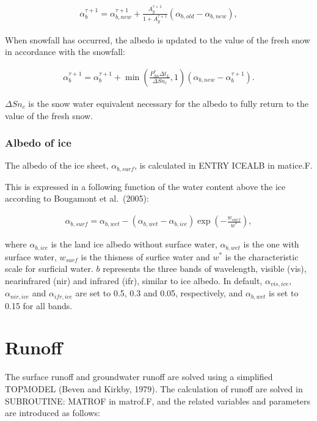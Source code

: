 \begin{eqnarray}
\alpha_b^{\tau+1} = \alpha_{b,new}^{\tau+1} + \frac{A_g^{\tau+1}}{1+A_g^{\tau+1}} (\alpha_{b,old}-\alpha_{b,new}), \label{8-62}
\end{eqnarray}

When snowfall has occurred, the albedo is updated to the value of the fresh snow in accordance with the snowfall:

\begin{eqnarray}
\alpha_b^{\tau+1} = \alpha_b^{\tau+1} + \min\left( \frac{P_{Sn}^{\ast} \Delta t_L}{\Delta Sn_c}, 1 \right) (\alpha_{b,new} - \alpha_b^{\tau+1}). \label{8-63}
\end{eqnarray}

\(\Delta Sn_c\) is the snow water equivalent necessary for the albedo to fully return to the value of the fresh snow.

\hypertarget{albedo-of-ice}{%
\subsubsection{Albedo of ice}\label{albedo-of-ice}}

The albedo of the ice sheet, \(\alpha_{b,surf}\), is calculated in ENTRY ICEALB in matice.F.

This is expressed in a following function of the water content above the ice according to Bougamont et al.~(2005):

\begin{eqnarray}
\alpha_{b,surf} = \alpha_{b,wet} - (\alpha_{b,wet}-\alpha_{b,ice}) \exp{\left( -\frac{w_{surf}}{w^{\ast}} \right)}, \label{8-64}
\end{eqnarray}

where \(\alpha_{b,ice}\) is the land ice albedo without surface water, \(\alpha_{b,wet}\) is the one with surface water, \(w_{surf}\) is the thisness of surfice water and \(w^{\ast}\) is the
characteristic scale for surficial water. \(b\) represents the three bands of wavelength, visible (vis), nearinfrared (nir) and infrared (ifr), similar to ice albedo. In default, \(\alpha_{vis,ice}\),
\(\alpha_{nir,ice}\) and \(\alpha_{ifr,ice}\) are set to 0.5, 0.3 and 0.05, respectively, and \(\alpha_{b,wet}\) is set to 0.15 for all bands.

\hypertarget{runoff}{%
\section{Runoff}\label{runoff}}

The surface runoff and groundwater runoff are solved using a simplified TOPMODEL (Beven and Kirkby, 1979). The calculation of runoff are solved in SUBROUTINE: MATROF in matrof.F, and the related
variables and parameters are introduced as follows:

